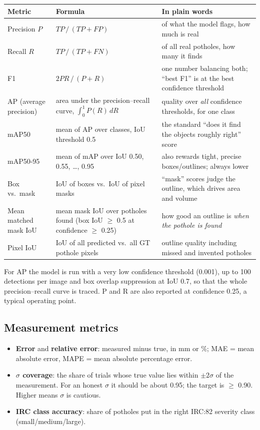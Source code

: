 \documentclass[11pt,a4paper]{article}
\begin{document}
\begin{center}
\small
\begin{tabularx}{\textwidth}{@{}>{\raggedright\arraybackslash}p{34mm} >{\raggedright\arraybackslash}p{46mm} X@{}}
\toprule
\textbf{Metric} & \textbf{Formula} & \textbf{In plain words}\\
\midrule
Precision $P$ & $TP\,/\,(TP+FP)$ & of what the model flags, how much is real\\
Recall $R$ & $TP\,/\,(TP+FN)$ & of all real potholes, how many it finds\\
F1 & $2PR\,/\,(P+R)$ & one number balancing both; ``best F1'' is at the best confidence threshold\\
AP (average precision) & area under the precision--recall curve, $\int_0^1 P(R)\,dR$ & quality over \emph{all} confidence thresholds, for one class\\
mAP50 & mean of AP over classes, IoU threshold 0.5 & the standard ``does it find the objects roughly right'' score\\
mAP50-95 & mean of mAP over IoU 0.50, 0.55, \ldots, 0.95 & also rewards tight, precise boxes/outlines; always lower\\
Box vs.\ mask & IoU of boxes vs.\ IoU of pixel masks & ``mask'' scores judge the outline, which drives area and volume\\
Mean matched mask IoU & mean mask IoU over potholes found (box IoU $\ge$ 0.5 at confidence $\ge$ 0.25) & how good an outline is \emph{when the pothole is found}\\
Pixel IoU & IoU of all predicted vs.\ all GT pothole pixels & outline quality including missed and invented potholes\\
\bottomrule
\end{tabularx}
\end{center}
For AP the model is run with a very low confidence threshold (0.001), up to 100 detections per image and box overlap
suppression at IoU 0.7, so that the whole precision--recall curve is traced. P and R are also reported at confidence
0.25, a typical operating point.

\subsection{Measurement metrics}
\begin{itemize}
  \item \textbf{Error} and \textbf{relative error}: measured minus true, in mm or \%; MAE = mean absolute error, MAPE =
        mean absolute percentage error.
  \item \textbf{$\sigma$ coverage}: the share of trials whose true value lies within $\pm2\sigma$ of the measurement.
        For an honest $\sigma$ it should be about 0.95; the target is $\ge$ 0.90. Higher means $\sigma$ is cautious.
  \item \textbf{IRC class accuracy}: share of potholes put in the right IRC:82 severity class (small/medium/large).
\end{itemize}
\end{document}
